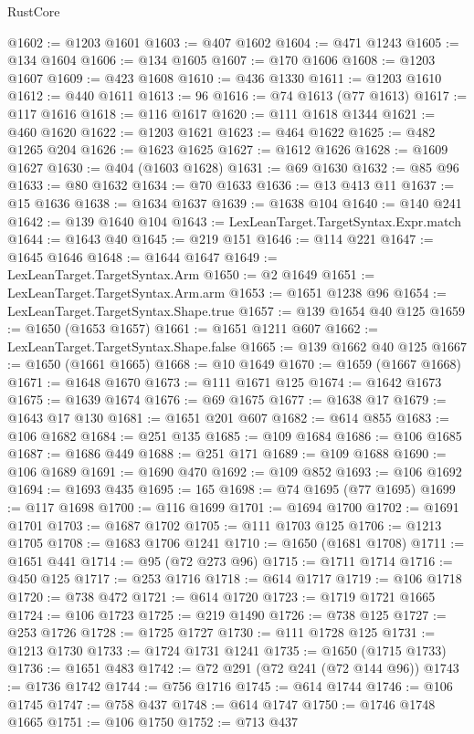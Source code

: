 \begin{lexlean}{RustCore}
\begin{coremodule}
@1602 := @1203 @1601
@1603 := @407 @1602
@1604 := @471 @1243
@1605 := @134 @1604
@1606 := @134 @1605
@1607 := @170 @1606
@1608 := @1203 @1607
@1609 := @423 @1608
@1610 := @436 @1330
@1611 := @1203 @1610
@1612 := @440 @1611
@1613 := 96
@1616 := @74 @1613 (@77 @1613)
@1617 := @117 @1616
@1618 := @116 @1617
@1620 := @111 @1618 @1344
@1621 := @460 @1620
@1622 := @1203 @1621
@1623 := @464 @1622
@1625 := @482 @1265 @204
@1626 := @1623 @1625
@1627 := @1612 @1626
@1628 := @1609 @1627
@1630 := @404 (@1603 @1628)
@1631 := @69 @1630
@1632 := @85 @96
@1633 := @80 @1632
@1634 := @70 @1633
@1636 := @13 @413 @11
@1637 := @15 @1636
@1638 := @1634 @1637
@1639 := @1638 @104
@1640 := @140 @241
@1642 := @139 @1640 @104
@1643 := LexLeanTarget.TargetSyntax.Expr.match
@1644 := @1643 @40
@1645 := @219 @151
@1646 := @114 @221
@1647 := @1645 @1646
@1648 := @1644 @1647
@1649 := LexLeanTarget.TargetSyntax.Arm
@1650 := @2 @1649
@1651 := LexLeanTarget.TargetSyntax.Arm.arm
@1653 := @1651 @1238 @96
@1654 := LexLeanTarget.TargetSyntax.Shape.true
@1657 := @139 @1654 @40 @125
@1659 := @1650 (@1653 @1657)
@1661 := @1651 @1211 @607
@1662 := LexLeanTarget.TargetSyntax.Shape.false
@1665 := @139 @1662 @40 @125
@1667 := @1650 (@1661 @1665)
@1668 := @10 @1649
@1670 := @1659 (@1667 @1668)
@1671 := @1648 @1670
@1673 := @111 @1671 @125
@1674 := @1642 @1673
@1675 := @1639 @1674
@1676 := @69 @1675
@1677 := @1638 @17
@1679 := @1643 @17 @130
@1681 := @1651 @201 @607
@1682 := @614 @855
@1683 := @106 @1682
@1684 := @251 @135
@1685 := @109 @1684
@1686 := @106 @1685
@1687 := @1686 @449
@1688 := @251 @171
@1689 := @109 @1688
@1690 := @106 @1689
@1691 := @1690 @470
@1692 := @109 @852
@1693 := @106 @1692
@1694 := @1693 @435
@1695 := 165
@1698 := @74 @1695 (@77 @1695)
@1699 := @117 @1698
@1700 := @116 @1699
@1701 := @1694 @1700
@1702 := @1691 @1701
@1703 := @1687 @1702
@1705 := @111 @1703 @125
@1706 := @1213 @1705
@1708 := @1683 @1706 @1241
@1710 := @1650 (@1681 @1708)
@1711 := @1651 @441
@1714 := @95 (@72 @273 @96)
@1715 := @1711 @1714
@1716 := @450 @125
@1717 := @253 @1716
@1718 := @614 @1717
@1719 := @106 @1718
@1720 := @738 @472
@1721 := @614 @1720
@1723 := @1719 @1721 @1665
@1724 := @106 @1723
@1725 := @219 @1490
@1726 := @738 @125
@1727 := @253 @1726
@1728 := @1725 @1727
@1730 := @111 @1728 @125
@1731 := @1213 @1730
@1733 := @1724 @1731 @1241
@1735 := @1650 (@1715 @1733)
@1736 := @1651 @483
@1742 := @72 @291 (@72 @241 (@72 @144 @96))
@1743 := @1736 @1742
@1744 := @756 @1716
@1745 := @614 @1744
@1746 := @106 @1745
@1747 := @758 @437
@1748 := @614 @1747
@1750 := @1746 @1748 @1665
@1751 := @106 @1750
@1752 := @713 @437

\end{coremodule}
\end{lexlean}
